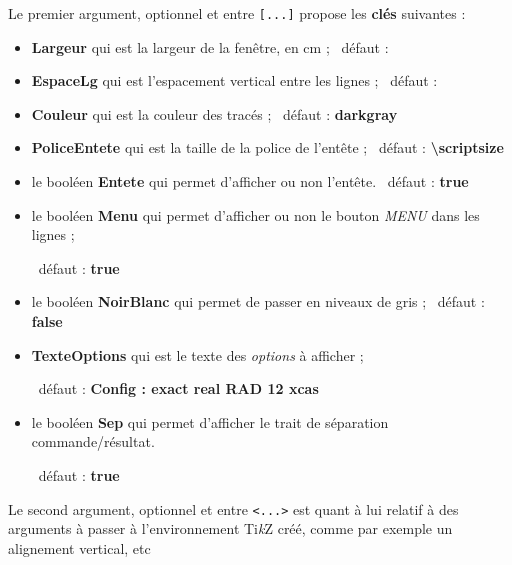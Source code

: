 \documentclass[french,a4paper,11pt]{article}
\providecommand\tikzlogo{Ti\textit{k}Z}
\let\TikZ\tikzlogo
\newcommand\Cle[1]{{\bfseries\sffamily\textlangle #1\textrangle}}
\begin{document}
\begin{tipblock}
Le premier argument, optionnel et entre \texttt{[...]} propose les \Cle{clés} suivantes :

\begin{itemize}
	\item \Cle{Largeur} qui est la largeur de la fenêtre, en cm ; \hfill~défaut : \Cle{10}
	\item \Cle{EspaceLg} qui est l'espacement vertical entre les lignes ; \hfill~défaut : \Cle{2pt}
	\item \Cle{Couleur} qui est la couleur des tracés ; \hfill~défaut : \Cle{darkgray}
	\item \Cle{PoliceEntete} qui est la taille de la police de l'entête ; \hfill~défaut : \Cle{\textbackslash scriptsize}
	\item le booléen \Cle{Entete} qui permet d'afficher ou non l'entête. \hfill~défaut : \Cle{true}
	\item le booléen \Cle{Menu} qui permet d'afficher ou non le bouton \textit{MENU} dans les lignes ;
	
	\hfill~défaut : \Cle{true}
	\item le booléen \Cle{NoirBlanc} qui permet de passer en niveaux de gris ; \hfill~défaut : \Cle{false}
	\item \Cle{TexteOptions} qui est le texte des \textit{options} à afficher ;
	
	\hfill~défaut : \Cle{Config : exact real RAD 12 xcas}
	\item le booléen \Cle{Sep} qui permet d'afficher le trait de séparation commande/résultat.
	
	\hfill~défaut : \Cle{true}
\end{itemize}
\vspace*{-\baselineskip}\leavevmode
\end{tipblock}

\begin{tipblock}
Le second argument, optionnel et entre \texttt{<...>} est quant à lui relatif à des arguments à passer à l'environnement \TikZ{} créé, comme par exemple un alignement vertical, etc
\end{tipblock}

\begin{PresentationCode}{}
\begin{CalculFormelXcas}[PoliceEntete=\large,Largeur=13,NoirBlanc]
\end{CalculFormelXcas}
\end{PresentationCode}
\end{document}
